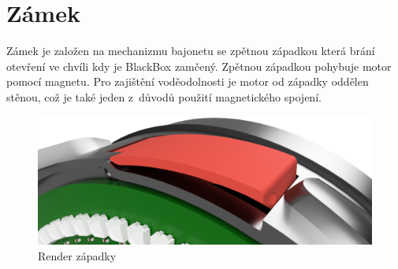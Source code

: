 \section{Zámek}
\label{zamek}

Zámek je založen na mechanizmu bajonetu se zpětnou západkou která brání otevření ve chvíli kdy je BlackBox zamčený.
Zpětnou západkou pohybuje motor pomocí magnetu. Pro zajištění vodě\-o\-dol\-nos\-ti je motor od západky oddělen stěnou, což je také jeden z~důvodů použití magne\-tic\-ké\-ho spojení.

\begin{figure}[h]
    \centering
    \includegraphics[width=\textwidth]{kapitoly/obrazky/E4/zapadka/render.png}
    \caption{Render západky}

    \label{fig:E4-zapadka}
\end{figure}

%   
%   


